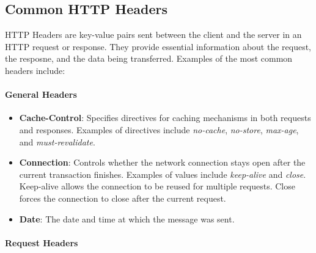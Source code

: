 \documentclass[a4paper]{article}
\begin{document}
    \subsection{Common HTTP Headers}

    HTTP Headers are key-value pairs sent between the client and the server in an HTTP request or response. They provide essential information about the request, the resposne, and the data being transferred. Examples of the most common headers include:

        \paragraph{General Headers}

        \begin{itemize}
            \item \textbf{Cache-Control}: Specifies directives for caching mechanisms in both requests and responses. Examples of directives include \textit{no-cache}, \textit{no-store}, \textit{max-age}, and \textit{must-revalidate}. 
            \item \textbf{Connection}: Controls whether the network connection stays open after the current transaction finishes. Examples of values include \textit{keep-alive} and \textit{close}. Keep-alive allows the connection to be reused for multiple requests. Close forces the connection to close after the current request.
            \item \textbf{Date}: The date and time at which the message was sent.
        \end{itemize}

        \paragraph{Request Headers}
\end{document}

